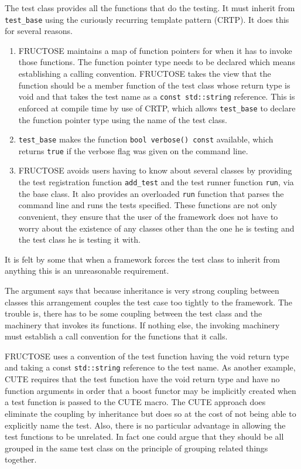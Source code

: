 \documentclass{book}
\begin{document}
The test class provides all the functions that do the testing. 
It must inherit from {\tt test\_base} using
the curiously recurring template pattern (CRTP).
It does this for several reasons.
\begin{enumerate}
\item FRUCTOSE maintains a map of function pointers for when it has to 
invoke those functions. The function pointer type needs to be
declared which means establishing a calling convention.
FRUCTOSE takes the view that the function should be a member function
of the test class whose return type is void and that takes the test name
as a {\tt const std::string} reference.
This is enforced at compile time by use of CRTP,
which allows {\tt test\_base} to declare 
the function pointer type using the name of the test class.

\item {\tt test\_base} makes 
the function {\tt bool verbose() const} available,
which returns {\tt true} if the verbose flag was given on the command line.

\item FRUCTOSE avoids users having to know about several classes
by providing the test registration function {\tt add\_test}
and the test runner function {\tt run}, via the base class.
It also provides an overloaded {\tt run} function that parses the
command line and runs the tests specified.
These functions are not only convenient, they ensure that the user of the
framework does not have to worry about the existence of any classes other than
the one he is testing and the test class he is testing it with.
\end{enumerate}

It is felt by some that when a framework forces the test class to inherit
from anything this is an unreasonable requirement.

The argument says that because inheritance is very strong coupling
between classes this arrangement couples the test case too tightly
to the framework. The trouble is, there has to be some coupling
between the test class and the machinery that invokes its functions.
If nothing else, the invoking machinery must establish a 
call convention for the functions that it calls.

FRUCTOSE uses a convention of the test function having the void
return type and taking a const {\tt std::string} reference to the
test name.
As another example, CUTE requires that the test function have the
void return type and have no function arguments in order that a
boost functor may be implicitly created when a test function is
passed to the CUTE macro.
The CUTE approach does eliminate the coupling by inheritance
but does so at the cost of not being able to explicitly name
the test. Also, there is no particular advantage in allowing
the test functions to be unrelated. In fact one could argue that
they should be all grouped in the same test class on the
principle of grouping related things together.
\end{document}
